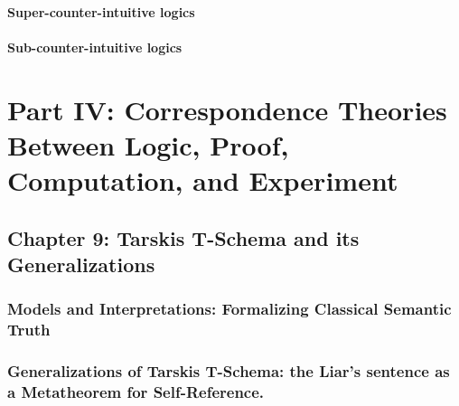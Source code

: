 \hypertarget{super-counter-intuitive-logics}{%
\paragraph*{Super-counter-intuitive
logics}\label{super-counter-intuitive-logics}}

\hypertarget{sub-counter-intuitive-logics}{%
\paragraph*{Sub-counter-intuitive
logics}\label{sub-counter-intuitive-logics}}

\hypertarget{part-iv-correspondence-theories-between-logic-proof-computation-and-experiment}{%
\section*{Part IV: Correspondence Theories Between Logic, Proof,
Computation, and
Experiment}\label{part-iv-correspondence-theories-between-logic-proof-computation-and-experiment}}

\hypertarget{chapter-9-tarskis-t-schema-and-its-generalizations}{%
\subsection*{Chapter 9: Tarski\textquotesingle s T-Schema and its
Generalizations}\label{chapter-9-tarskis-t-schema-and-its-generalizations}}

\hypertarget{models-and-interpretations-formalizing-classical-semantic-truth}{%
\subsubsection*{Models and Interpretations: Formalizing Classical
Semantic
Truth}\label{models-and-interpretations-formalizing-classical-semantic-truth}}

\hypertarget{generalizations-of-tarskis-t-schema-the-liars-sentence-as-a-metatheorem-for-self-reference.}{%
\subsubsection*{Generalizations of Tarski\textquotesingle s T-Schema:
the Liar's sentence as a Metatheorem for
Self-Reference.}\label{generalizations-of-tarskis-t-schema-the-liars-sentence-as-a-metatheorem-for-self-reference.}}

